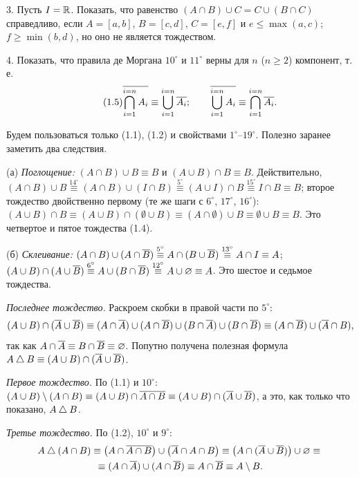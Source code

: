 3. Пусть $I=\mathbb R$. Показать, что равенство
$(A\cap B)\cup C=C\cup(B\cap C)$ справедливо, если $A=[a,b]$, $B=[c,d]$,
$C=[e,f]$ и $e\le\max(a,c)$; $f\ge\min(b,d)$, но оно не является
тождеством.

4. Показать, что правила де Моргана $10^\circ$ и $11^\circ$ верны для
$n$ ($n\ge2$) компонент, т.\,е.
\begin{equation}\tag{1.5}
\overline{\bigcap_{i=1}^{i=n}A_i}\equiv\bigcup_{i=1}^{i=n}\overline{A_i};\qquad
\overline{\bigcup_{i=1}^{i=n}A_i}\equiv\bigcap_{i=1}^{i=n}\overline{A_i}.
\end{equation}

\begin{solution}[1 (\S\,1)]
Будем пользоваться только (1.1), (1.2) и свойствами $1^\circ$--$19^\circ$.
Полезно заранее заметить два следствия.

(а) \emph{Поглощение:} $(A\cap B)\cup B\equiv B$ и $(A\cup B)\cap B\equiv B$.
Действительно,
$(A\cap B)\cup B\overset{14^\circ}{\equiv}(A\cap B)\cup(I\cap B)
\overset{5^\circ}{\equiv}(A\cup I)\cap B\overset{15^\circ}{\equiv}I\cap B\equiv B$;
второе тождество двойственно первому (те же шаги с $6^\circ$, $17^\circ$,
$16^\circ$):
$(A\cup B)\cap B\equiv(A\cup B)\cap(\emptyset\cup B)\equiv(A\cap\emptyset)\cup B\equiv\emptyset\cup B\equiv B$.
Это четвертое и пятое тождества (1.4).

(б) \emph{Склеивание:}
$(A\cap B)\cup(A\cap\overline{B})\overset{5^\circ}{\equiv}A\cap(B\cup\overline{B})
\overset{13^\circ}{\equiv}A\cap I\equiv A$;
$(A\cup B)\cap(A\cup\overline{B})\overset{6^\circ}{\equiv}A\cup(B\cap\overline{B})
\overset{12^\circ}{\equiv}A\cup\varnothing\equiv A$. Это шестое и седьмое тождества.

\smallskip
\emph{Последнее тождество.} Раскроем скобки в правой части по $5^\circ$:
\[
(A\cup B)\cap(\overline{A}\cup\overline{B})\equiv(A\cap\overline{A})\cup(A\cap\overline{B})\cup(B\cap\overline{A})\cup(B\cap\overline{B})
\equiv(A\cap\overline{B})\cup(\overline{A}\cap B),
\]
так как $A\cap\overline{A}\equiv B\cap\overline{B}\equiv\varnothing$. Попутно получена
полезная формула $A\mathbin{\triangle} B\equiv(A\cup B)\cap(\overline{A}\cup\overline{B})$.

\emph{Первое тождество.} По (1.1) и $10^\circ$:
$(A\cup B)\setminus(A\cap B)\equiv(A\cup B)\cap\overline{A\cap B}\equiv(A\cup B)\cap(\overline{A}\cup\overline{B})$,
а это, как только что показано, $A\mathbin{\triangle} B$.

\emph{Третье тождество.} По (1.2), $10^\circ$ и $9^\circ$:
\begin{multline*}
A\mathbin{\triangle}(A\cap B)\equiv\bigl(A\cap\overline{A\cap B}\bigr)\cup\bigl(\overline{A}\cap A\cap B\bigr)
\equiv\bigl(A\cap(\overline{A}\cup\overline{B})\bigr)\cup\varnothing\equiv{}\\
\equiv(A\cap\overline{A})\cup(A\cap\overline{B})\equiv A\cap\overline{B}\equiv A\setminus B.
\end{multline*}


\end{solution}
